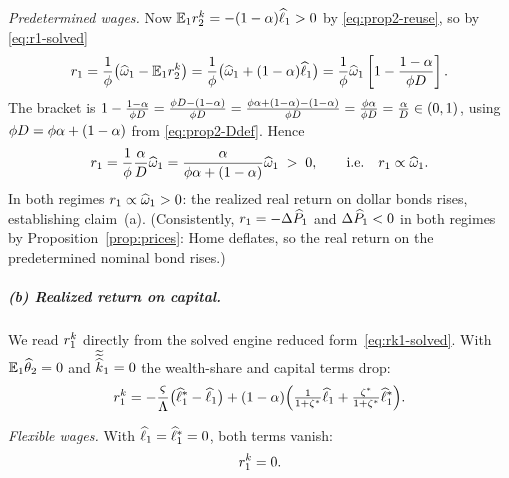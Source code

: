 \emph{Predetermined wages.} Now $\mathbb{E}_1r^{k}_2=-(1-\alpha)\widehat{\ell}_1>0$ by
\eqref{eq:prop2-reuse}, so by \eqref{eq:r1-solved}
\begin{equation}
r_1 = \frac{1}{\phi}\bigl(\widehat{\omega}_1-\mathbb{E}_1r^{k}_2\bigr)
= \frac{1}{\phi}\bigl(\widehat{\omega}_1+(1-\alpha)\widehat{\ell}_1\bigr)
= \frac{1}{\phi}\widehat{\omega}_1\left[1-\frac{1-\alpha}{\phi D}\right]. \label{eq:prop2a-sticky}
\end{equation}
The bracket is
$1-\frac{1-\alpha}{\phi D}=\frac{\phi D-(1-\alpha)}{\phi D}
=\frac{\phi\alpha+(1-\alpha)-(1-\alpha)}{\phi D}
=\frac{\phi\alpha}{\phi D}=\frac{\alpha}{D}\in(0,1)$, using
$\phi D=\phi\alpha+(1-\alpha)$ from \eqref{eq:prop2-Ddef}. Hence
\begin{equation}
r_1 = \frac{1}{\phi}\frac{\alpha}{D}\widehat{\omega}_1
=\frac{\alpha}{\phi\alpha+(1-\alpha)}\widehat{\omega}_1 \;>\;0,
\qquad\text{i.e.}\quad r_1\propto\widehat{\omega}_1. \label{eq:prop2a-sticky2}
\end{equation}
In both regimes $r_1\propto\widehat{\omega}_1>0$: the realized real return on dollar
bonds rises, establishing claim~(a). (Consistently, $r_1=-\Delta\widehat{P}_1$ and
$\Delta\widehat{P}_1<0$ in both regimes by Proposition~\ref{prop:prices}: Home deflates,
so the real return on the predetermined nominal bond rises.)

\subparagraph{(b) Realized return on capital.} We read $r^{k}_1$ directly from the
solved engine reduced form~\eqref{eq:rk1-solved}. With $\mathbb{E}_1\widehat{\theta}_2=0$ and
$\widetilde{\widetilde{\widehat{k}}}_1=0$ the wealth-share and capital terms drop:
\begin{equation}
r^{k}_1 = -\frac{\varsigma}{\Lambda}\bigl(\widehat{\ell}^{*}_1-\widehat{\ell}_1\bigr)
+(1-\alpha)\Bigl(\tfrac{1}{1+\zeta^{*}}\widehat{\ell}_1+\tfrac{\zeta^{*}}{1+\zeta^{*}}\widehat{\ell}^{*}_1\Bigr). \label{eq:prop2b-rk}
\end{equation}

\emph{Flexible wages.} With $\widehat{\ell}_1=\widehat{\ell}^{*}_1=0$, both terms vanish:
\begin{equation}
r^{k}_1 = 0. \label{eq:prop2b-flex}
\end{equation}

